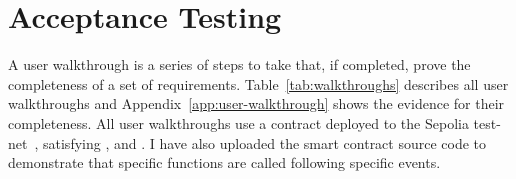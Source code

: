 
\section{Acceptance Testing}\label{sec:acc-tests}

A user walkthrough is a series of steps to take that, if completed, prove the completeness of a set of requirements. Table~\ref{tab:walkthroughs} describes all user walkthroughs and Appendix~\ref{app:user-walkthrough} shows the evidence for their completeness.
All user walkthroughs use a contract deployed to the Sepolia test-net~\cite{etherscanio_library_nodate}, satisfying ,  and . I have also uploaded the smart contract source code to demonstrate that specific functions are called following specific events. 

\newcommand{\p}[1]{$P_{#1}$}
\newcommand{\g}[1]{$G_{#1}$}

